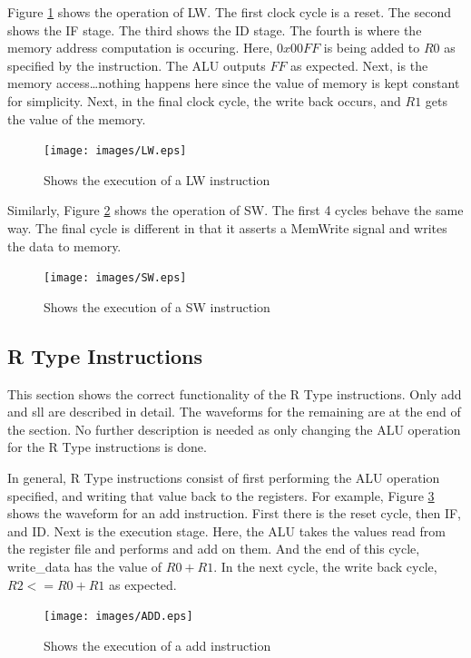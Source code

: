 \documentclass[12pt, a4paper]{article}
\begin{document}
Figure \ref{fig:lw} shows the operation of LW. The first clock cycle is a reset. The second shows the IF
stage. The third shows the ID stage. The fourth is where the memory address computation is occuring. Here,
$0x00FF$ is being added to $R0$ as specified by the instruction. The ALU outputs $FF$ as expected. Next, is
the memory access\dots nothing happens here since the value of memory is kept constant for simplicity. Next,
in the final clock cycle, the write back occurs, and $R1$ gets the value of the memory.

\begin{figure}[H]
  \centering
  \texttt{[image: images/LW.eps]}
  \caption{Shows the execution of a LW instruction}
  \label{fig:lw}
\end{figure}

Similarly, Figure \ref{fig:sw} shows the operation of SW. The first 4 cycles behave the same way. The final
cycle is different in that it asserts a MemWrite signal and writes the data to memory.

\begin{figure}[H]
  \centering
  \texttt{[image: images/SW.eps]}
  \caption{Shows the execution of a SW instruction}
  \label{fig:sw}
\end{figure}

\subsection{R Type Instructions}
This section shows the correct functionality of the R Type instructions. Only add and sll
are described in detail. The waveforms for the remaining are at the end of the section. No further
description is needed as only changing the ALU operation for the R Type instructions is done.

In general, R Type instructions consist of first performing the ALU operation specified, and writing
that value back to the registers. For example, Figure \ref{fig:add} shows the waveform for an add 
instruction. First there is the reset cycle, then IF, and ID. Next is the execution stage. Here, the
ALU takes the values read from the register file and performs and add on them. And the end of this
cycle, write\_data has the value of $R0 + R1$. In the next cycle, the write back cycle,
$R2 <= R0 + R1$ as expected.

\begin{figure}[H]
  \centering
  \texttt{[image: images/ADD.eps]}
  \caption{Shows the execution of a add instruction}
  \label{fig:add}
\end{figure}
\end{document}

